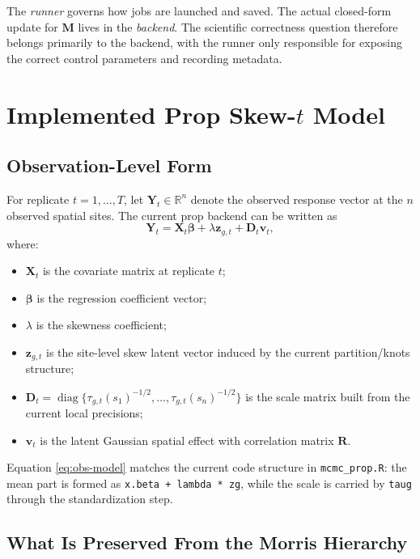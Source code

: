 \documentclass[11pt]{article}
\newcommand{\bY}{\mathbf{Y}}
\newcommand{\bX}{\mathbf{X}}
\newcommand{\bD}{\mathbf{D}}
\newcommand{\bR}{\mathbf{R}}
\newcommand{\bM}{\mathbf{M}}
\newcommand{\bz}{\mathbf{z}}
\newcommand{\diag}{\operatorname{diag}}
\begin{document}
The \emph{runner} governs how jobs are launched and saved. The actual
closed-form update for $\bM$ lives in the \emph{backend}. The scientific
correctness question therefore belongs primarily to the backend, with the
runner only responsible for exposing the correct control parameters and
recording metadata.

\section{Implemented Prop Skew-\texorpdfstring{$t$}{t} Model}

\subsection{Observation-Level Form}

For replicate $t = 1,\ldots,T$, let $\bY_t \in \mathbb{R}^n$ denote the
observed response vector at the $n$ observed spatial sites. The current prop
backend can be written as
\begin{equation}
\bY_t = \bX_t \bm{\beta} + \lambda \bz_{g,t} + \bD_t \mathbf{v}_t,
\label{eq:obs-model}
\end{equation}
where:

\begin{itemize}
\item $\bX_t$ is the covariate matrix at replicate $t$;
\item $\bm{\beta}$ is the regression coefficient vector;
\item $\lambda$ is the skewness coefficient;
\item $\bz_{g,t}$ is the site-level skew latent vector induced by the current
partition/knots structure;
\item $\bD_t = \diag\{\tau_{g,t}(s_1)^{-1/2}, \ldots,
\tau_{g,t}(s_n)^{-1/2}\}$ is the scale matrix built from the current local
precisions;
\item $\mathbf{v}_t$ is the latent Gaussian spatial effect with correlation
matrix $\bR$.
\end{itemize}

Equation \eqref{eq:obs-model} matches the current code structure in
\texttt{mcmc\_prop.R}: the mean part is formed as
\texttt{x.beta + lambda * zg}, while the scale is carried by \texttt{taug}
through the standardization step.

\subsection{What Is Preserved From the Morris Hierarchy}
\end{document}
